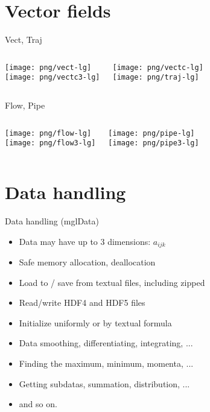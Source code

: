 \documentclass[color=usenames]{beamer}
\begin{document}
\section{Vector fields}

\begin{frame}{Vect, Traj}
\begin{columns}
\texttt{[image: png/vect-lg]}\\
\texttt{[image: png/vectc3-lg]}

\texttt{[image: png/vectc-lg]}\\
\texttt{[image: png/traj-lg]}

\end{columns}
\end{frame}

\begin{frame}{Flow, Pipe}
\begin{columns}
\texttt{[image: png/flow-lg]}\\
\texttt{[image: png/flow3-lg]}

\texttt{[image: png/pipe-lg]}\\
\texttt{[image: png/pipe3-lg]}

\end{columns}
\end{frame}


\section{Data handling}
\begin{frame}{Data handling (mglData)}
\Large
\begin{itemize}
\item Data may have up to 3 dimensions: $a_{ijk}$
\item Safe memory allocation, deallocation
\item Load to / save from textual files, including zipped
\item Read/write HDF4 and HDF5 files
\item Initialize uniformly or by textual formula
\item Data smoothing, differentiating, integrating, ...
\item Finding the maximum, minimum, momenta, ...
\item Getting subdatas, summation, distribution, ...
\item and so on.
\end{itemize}
\end{frame}
\end{document}
